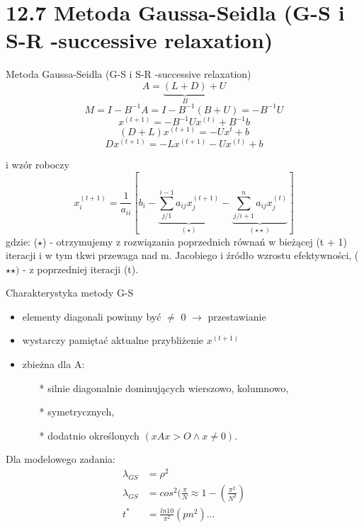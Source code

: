 \section{12.7 Metoda Gaussa-Seidla (G-S i S-R -successive relaxation)}

\begin{frame}{Metoda Gaussa-Seidla (G-S i S-R -successive relaxation)}
  $$A=\underbrace{(L+D)}_{B}+U$$
  $$M=I-B^{-1}A=I-B^{-1}(B+U)=-B^{-1}U$$
  $$x^{(t+1)}=-B^{-1}Ux^{(t)}+B^{-1}b$$
  $$(D+L)x^{(t+1)}=-Ux^t+b$$
  $$\boxed{Dx^{(t+1)}=-Lx^{(t+1)}-Ux^{(t)}+b}$$
\end{frame}

\begin{frame}{}
  i wzór roboczy
  $$x^{(t+1)}_i=\frac{1}{a_{ii}}[b_i-\underbrace{\sum^{i-1}_{j/1} a_{ij}x^{(t+1)}_j}_{(\star)}-\underbrace{\sum^{n}_{j/i+1} a_{ij}x^{(t)}_{j}}_{(\star\star)}]$$
  gdzie: ($\star$) - otrzymujemy z rozwiązania poprzednich równań w bieżącej (t + 1) iteracji i w tym tkwi przewaga nad m. Jacobiego i źródło wzrostu efektywności, ($\star\star)$ - z poprzedniej iteracji (t).
\end{frame}

\begin{frame}{}
  \begin{block}{Charakterystyka metody G-S}
    \begin{itemize}
      \item elementy diagonali powinny być $\neq$ 0 $\rightarrow$ przestawianie
      \item wystarczy pamiętać aktualne przybliżenie $x^{(t+1)}$
      \item zbieżna dla A:
      \begin{itemize}
        \item[*] silnie diagonalnie dominujących wierszowo, kolumnowo,
        \item[*] symetrycznych,
        \item[*] dodatnio określonych $(xAx>O\wedge x\neq 0)$.
      \end{itemize}
    \end{itemize}
  \end{block}
\end{frame}

\begin{frame}{}
  Dla modelowego zadania:
  \begin{align*}
  \lambda_{GS}&=\rho^2\\
  \lambda_{GS}&=cos^2(\frac{\pi}{N}\approx 1-(\frac{\pi^2}{N^2})\\
          t^* &= \frac{ln10}{\pi^2}(pn^2)...
  \end{align*}
\end{frame}


